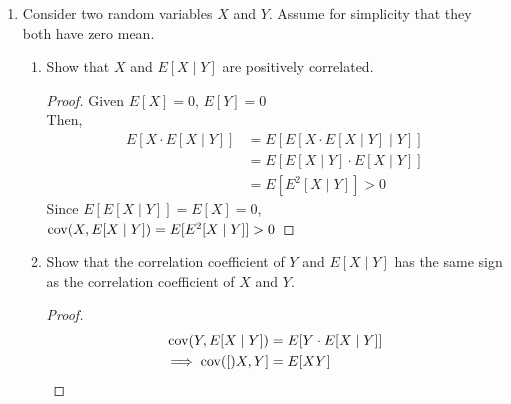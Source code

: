 \documentclass[paper=usletter, fontsize=12pt]{article}
\begin{document}
\begin{enumerate}
\begin{enumerate}
\begin{proof}
                If $Y=0$, $Z=0$,\\
                then $\max{0,X}=X$ and $\max{0,-X}=0$\\
                Therefore,
                \begin{align*}
                    \var{\max{0,X}}+\var{\max{0,-X}} &=\var{0}+\var{0} \\
                    & =0
                \end{align*}

                Therefore, $\var{X} \ge \var{\max\{0,X\}}+\var{\max\{0,-X\}}$
                \qedhere

            \end{proof}

        \end{enumerate}

        \item Consider two random variables $X$ and $Y$. Assume for simplicity
        that they both have zero mean.
        \begin{enumerate}

            \item Show that $X$ and $E[X\mid Y]$ are positively correlated.
            \begin{proof}

                Given $E[X]=0$, $E[Y]=0$\\
                Then,
                \begin{align*}
                    E[X\cdot E[X\mid Y]] & = E[E[X\cdot E[X\mid Y] \mid Y]] \\
                    & = E[E[X\mid Y]\cdot E[X\mid Y]] \\
                    & = E[E^2[X\mid Y]] > 0
                \end{align*}
                Since $E[E[X\mid Y]]=E[X]=0$,\\
                $\operatorname{cov}(X,E[X\mid Y]) = E[E^2[X\mid Y]] > 0$ \qedhere

            \end{proof}

            \item Show that the correlation coefficient of $Y$ and $E[X\mid Y]$
            has the same sign as the correlation coefficient of $X$ and $Y$.
            \begin{proof}

                \begin{align*}
                    \operatorname{cov}(Y,E[X\mid Y]) & = E[Y\cdot E[X\mid Y]] \\
                    \implies \operatorname{cov}([)X,Y] & = E[XY]
                \end{align*}

            \end{proof}

        \end{enumerate}

    \end{enumerate}
\end{document}
